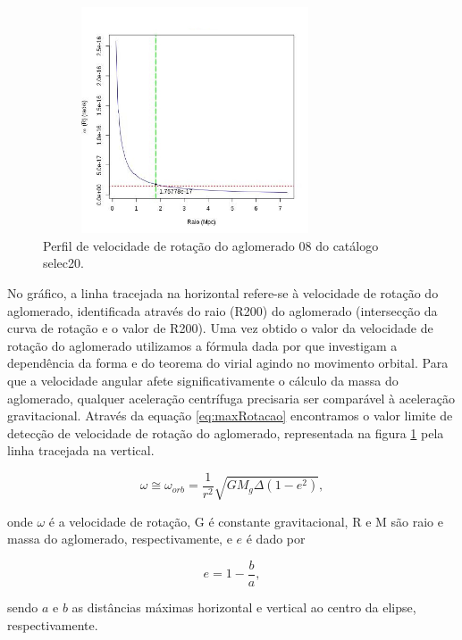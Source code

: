 \begin{figure}[H] %
\vspace{-2pt}
\begin{center}
\includegraphics[height=6.7cm,width=9cm]{04-figuras/rotacao}%
\caption{Perfil de velocidade de rotação do aglomerado 08 do catálogo selec20.}
\label{rotacao}%
\end{center}
\end{figure}

No gráfico, a linha tracejada na horizontal refere-se à velocidade de rotação do aglomerado, identificada através do raio (R200) do aglomerado (intersecção da curva de rotação e o valor de R200). Uma vez obtido o valor da velocidade de rotação do aglomerado utilizamos a fórmula dada por  que investigam a dependência da forma e do teorema do virial agindo no movimento orbital. Para que a velocidade angular afete significativamente o cálculo da massa do aglomerado, qualquer aceleração centrífuga precisaria ser comparável à aceleração gravitacional. Através da equação \ref{eq:maxRotacao} encontramos o valor limite de detecção de velocidade de rotação do aglomerado, representada na figura \ref{rotacao} pela linha tracejada na vertical.

\begin{equation}
\omega \cong \omega_{orb} = \frac{1}{r^2} \sqrt{G M_g \Delta (1 - e^2)}, 
\label{eq:maxRotacao}
\end{equation}

\noindent onde $\omega$ é a velocidade de rotação, G é constante gravitacional, R e M são raio e massa do aglomerado, respectivamente, e $e$ é dado por 

\begin{equation}
e = 1 - \frac{b}{a}, 
\label{eq:exce}
\end{equation}

\noindent sendo $a$ e $b$ as distâncias máximas horizontal e vertical ao centro da elipse, respectivamente.

